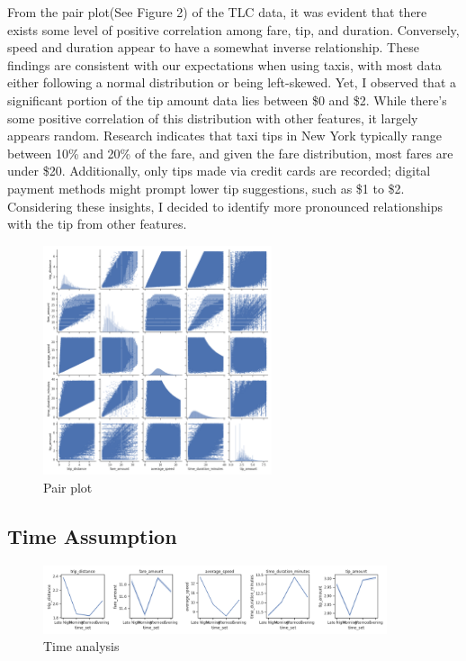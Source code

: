 \documentclass[11pt]{article}
\begin{document}
From the pair plot(See Figure 2) of the TLC data, it was evident that there exists some level of positive correlation among fare, tip, and duration. Conversely, speed and duration appear to have a somewhat inverse relationship. These findings are consistent with our expectations when using taxis, with most data either following a normal distribution or being left-skewed. Yet, I observed that a significant portion of the tip amount data lies between \$0 and \$2. While there's some positive correlation of this distribution with other features, it largely appears random. Research indicates that taxi tips in New York typically range between 10\% and 20\% of the fare, and given the fare distribution, most fares are under \$20. Additionally, only tips made via credit cards are recorded; digital payment methods might prompt lower tip suggestions, such as \$1 to \$2. Considering these insights, I decided to identify more pronounced relationships with the tip from other features.
\begin{figure}[h]
    \includegraphics[width=0.6\textwidth]{plots/pair plot.png}
    \centering
    \caption{Pair plot}
\end{figure}


\subsection{Time Assumption}

\begin{figure}[h]
    \includegraphics[width=0.9\textwidth]{plots/combined plot.png}
    \centering
    \caption{Time analysis}
\end{figure}
\end{document}
